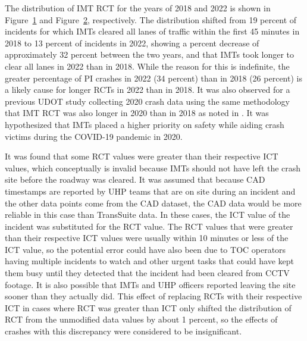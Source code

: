 \documentclass[
  letterpaper,
  authoryear]{elsarticle}
\begin{document}
The distribution of IMT RCT for the years of 2018 and 2022 is shown in
Figure~\ref{fig-RCT2018} and Figure~\ref{fig-RCT2022}, respectively. The
distribution shifted from 19 percent of incidents for which IMTs cleared
all lanes of traffic within the first 45 minutes in 2018 to 13 percent
of incidents in 2022, showing a percent decrease of approximately 32
percent between the two years, and that IMTs took longer to clear all
lanes in 2022 than in 2018. While the reason for this is indefinite, the
greater percentage of PI crashes in 2022 (34 percent) than in 2018 (26
percent) is a likely cause for longer RCTs in 2022 than in 2018. It was
also observed for a previous UDOT study collecting 2020 crash data using
the same methodology that IMT RCT was also longer in 2020 than in 2018
as noted in \citet{schultz_analysis_2023}. It was hypothesized that IMTs
placed a higher priority on safety while aiding crash victims during the
COVID-19 pandemic in 2020.

\begin{figure}


\caption{\label{fig-RCT2018}}

\end{figure}%

\begin{figure}


\caption{\label{fig-RCT2022}}

\end{figure}%

It was found that some RCT values were greater than their respective ICT
values, which conceptually is invalid because IMTs should not have left
the crash site before the roadway was cleared. It was assumed that
because CAD timestamps are reported by UHP teams that are on site during
an incident and the other data points come from the CAD dataset, the CAD
data would be more reliable in this case than TransSuite data. In these
cases, the ICT value of the incident was substituted for the RCT value.
The RCT values that were greater than their respective ICT values were
usually within 10 minutes or less of the ICT value, so the potential
error could have also been due to TOC operators having multiple
incidents to watch and other urgent tasks that could have kept them busy
until they detected that the incident had been cleared from CCTV
footage. It is also possible that IMTs and UHP officers reported leaving
the site sooner than they actually did. This effect of replacing RCTs
with their respective ICT in cases where RCT was greater than ICT only
shifted the distribution of RCT from the unmodified data values by about
1 percent, so the effects of crashes with this discrepancy were
considered to be insignificant.
\end{document}
